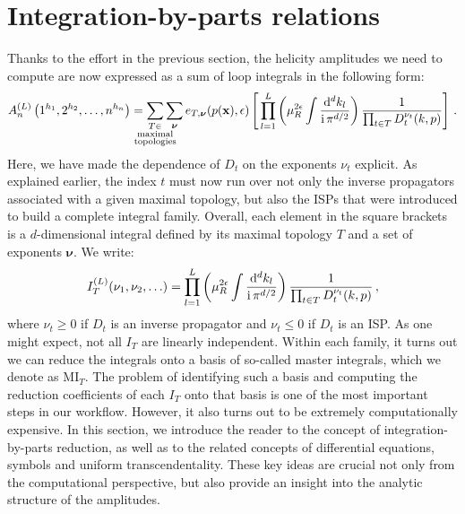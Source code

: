 \documentclass[main.tex]{subfiles}
\begin{document}
\section{Integration-by-parts relations} \label{sec:IBP}
Thanks to the effort in the previous section, the helicity amplitudes we need to compute are now expressed as a sum of loop integrals in the following form:
\begin{equation} \label{eq:ampreducedschematic}
    	A_n^{(L)} \left(1^{h_1}, 2^{h_2}, \ldots, n^{h_n} \right) =  
     \sum_{\mathclap{\substack{T \in \\ \text{maximal} \\ \text{topologies}}}} \sum_{\bm{\nu}} e_{T, \bm{\nu}}(p(\mathbf{x}), \eps) \left[\, \prod_{l=1}^{L} 
     \left( \mu_R^{2\eps} \int \frac{\dd^d k_l}{\ii \, \pi^{d/2}}\right)
 \frac{1}{\prod_{t\in T} D^{\nu_t}_t(k,p)} \right]\,.
\end{equation}
Here, we have made the dependence of $D_t$ on the exponents $\nu_t$ explicit. As explained earlier, the index $t$ must now run over not only the inverse propagators associated with a given maximal topology, but also the ISPs that were introduced to build a complete integral family. Overall, each element in the square brackets is a $d$-dimensional integral defined by its maximal topology $T$ and a set of exponents $\bm{\nu}$. We write:
\begin{equation} \label{eq:ibpintegral}
    I_T^{(L)}(\nu_1, \nu_2, \ldots) = \prod_{l=1}^{L} 
     \left( \mu_R^{2\epsilon} \int \frac{\mathrm{d}^d k_l}{\mathrm{i} \, \pi^{d/2}}\right)
 \frac{1}{\prod_{t\in T} D^{\nu_t}_t(k,p)}\,,
\end{equation}
where $\nu_t \geq 0$ if $D_t$ is an inverse propagator and $\nu_t\le0$ if $D_t$ is an ISP. As one might expect, not all $I_T$ are linearly independent. Within each family, it turns out we can reduce the integrals onto a basis of so-called master integrals, which we denote as $\text{MI}_T$. The problem of identifying such a basis and computing the reduction coefficients of each $I_T$ onto that basis is one of the most important steps in our workflow. However, it also turns out to be extremely computationally expensive. In this section, we introduce the reader to the concept of integration-by-parts reduction, as well as to the related concepts of differential equations, symbols and uniform transcendentality. These key ideas are crucial not only from the computational perspective, but also provide an insight into the analytic structure of the amplitudes.
\end{document}
